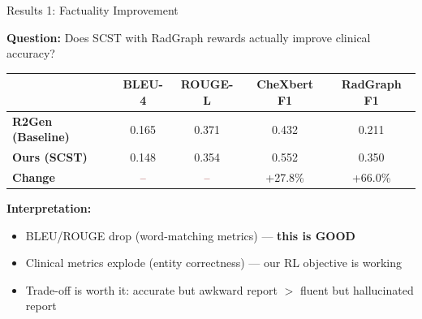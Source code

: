 \documentclass[aspectratio=169]{beamer}
\begin{document}
\begin{frame}{Results 1: Factuality Improvement}
  
  \textbf{Question:} Does SCST with RadGraph rewards actually improve clinical accuracy?
  
  \vspace{0.3cm}
  
  \begin{center}
    \begin{tabular}{lcccc}
      \toprule
      & \textbf{BLEU-4} & \textbf{ROUGE-L} & \textbf{CheXbert F1} & \textbf{RadGraph F1} \\
      \midrule
      \textbf{R2Gen (Baseline)} & 0.165 & 0.371 & 0.432 & 0.211 \\
      \textbf{Ours (SCST)} & 0.148 & 0.354 & 0.552 & 0.350 \\
      \textbf{Change} & \textcolor{darkred}{--} & \textcolor{darkred}{--} & \textcolor{medgreen}{+27.8\%} & \textcolor{medgreen}{+66.0\%} \\
      \bottomrule
    \end{tabular}
  \end{center}
  
  \vspace{0.5cm}
  
  \textbf{Interpretation:}
  \begin{itemize}
    \item BLEU/ROUGE drop (word-matching metrics) — \textcolor{medgreen}{\textbf{this is GOOD}}
    \item Clinical metrics explode (entity correctness) — our RL objective is working
    \item Trade-off is worth it: accurate but awkward report $>$ fluent but hallucinated report
  \end{itemize}
  
\end{frame}
\end{document}
